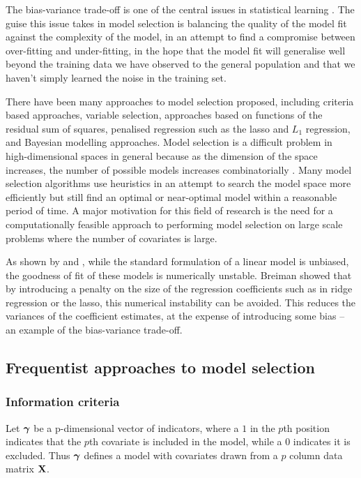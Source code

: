 The bias-variance trade-off is one of the central issues in statistical learning
\citep{Murphy:2012:MLP:2380985, Bishop:2006:PRM:1162264, hastie01statisticallearning}. The guise this issue
takes in model selection is balancing the quality of the model fit against the complexity of the model, in an
attempt to find a compromise between over-fitting and under-fitting, in the hope that the model fit will
generalise well beyond the training data we have observed to the general population and that we haven't simply
learned the noise in the training set.

There have been many approaches to model selection proposed, including criteria based approaches, variable
selection, approaches based on functions of the residual sum of squares, penalised regression such as the
lasso and $L_1$ regression, and Bayesian modelling approaches. Model selection is a difficult problem in
high-dimensional spaces in general because as the dimension of the space increases, the number of possible models
increases combinatorially \citep{Schelldorfer2010}. Many model selection algorithms use heuristics in an
attempt to search the model space more efficiently but still find an optimal or near-optimal model within a
reasonable period of time. A major motivation for this field of research is the need for a computationally
feasible approach to performing model selection on large scale problems where the number of covariates is
large.

As shown by \citep{Breiman1996} and \citep{Efron2013}, while the standard formulation of a linear model is
unbiased, the goodness of fit of these models is numerically  unstable. Breiman showed that by introducing a
penalty on the size of the regression coefficients such as  in ridge regression or the lasso, this numerical
instability can be avoided. This reduces the variances of the coefficient estimates, at the expense of
introducing some bias -- an example of the bias-variance trade-off.

\subsection{Frequentist approaches to model selection}
\subsubsection{Information criteria}
Let ${\boldsymbol \gamma}$ be a p-dimensional vector of indicators, where a $1$ in the $p$th position indicates that the
$p$th covariate is included in the model, while a $0$ indicates it is excluded. Thus ${\boldsymbol \gamma}$ defines a
model with covariates drawn from a $p$ column data matrix ${\bf X}$.

